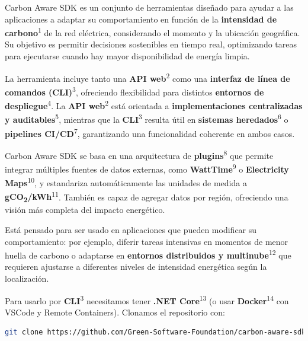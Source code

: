 \documentclass[12pt,a4paper]{report}
\begin{document}
Carbon Aware SDK es un conjunto de herramientas diseñado para ayudar a las aplicaciones a adaptar su comportamiento en función de la \textbf{intensidad de carbono}\textsuperscript{1} de la red eléctrica, considerando el momento y la ubicación geográfica. Su objetivo es permitir decisiones sostenibles en tiempo real, optimizando tareas para ejecutarse cuando hay mayor disponibilidad de energía limpia.

La herramienta incluye tanto una \textbf{API web}\textsuperscript{2} como una \textbf{interfaz de línea de comandos (CLI)}\textsuperscript{3}, ofreciendo flexibilidad para distintos \textbf{entornos de despliegue}\textsuperscript{4}. La \textbf{API web}\textsuperscript{2} está orientada a \textbf{implementaciones centralizadas y auditables}\textsuperscript{5}, mientras que la \textbf{CLI}\textsuperscript{3} resulta útil en \textbf{sistemas heredados}\textsuperscript{6} o \textbf{pipelines CI/CD}\textsuperscript{7}, garantizando una funcionalidad coherente en ambos casos.

Carbon Aware SDK se basa en una arquitectura de \textbf{plugins}\textsuperscript{8} que permite integrar múltiples fuentes de datos externas, como \textbf{WattTime}\textsuperscript{9} o \textbf{Electricity Maps}\textsuperscript{10}, y estandariza automáticamente las unidades de medida a \textbf{gCO\textsubscript{2}/kWh}\textsuperscript{11}. También es capaz de agregar datos por región, ofreciendo una visión más completa del impacto energético.

Está pensado para ser usado en aplicaciones que pueden modificar su comportamiento: por ejemplo, diferir tareas intensivas en momentos de menor huella de carbono o adaptarse en \textbf{entornos distribuidos y multinube}\textsuperscript{12} que requieren ajustarse a diferentes niveles de intensidad energética según la localización.

Para usarlo por \textbf{CLI}\textsuperscript{3} necesitamos tener \textbf{.NET Core}\textsuperscript{13} (o usar \textbf{Docker}\textsuperscript{14} con VSCode y Remote Containers). Clonamos el repositorio con:

\begin{tcolorbox}[colback=codebackground, colframe=codeborder, boxrule=0.8pt, arc=0mm, boxsep=5pt, left=5pt, right=5pt, top=5pt, bottom=5pt]
\begin{lstlisting}[language=bash]
git clone https://github.com/Green-Software-Foundation/carbon-aware-sdk.git
\end{lstlisting}
\end{tcolorbox}
\end{document}
